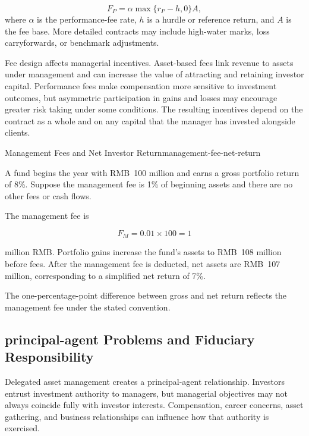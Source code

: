 \begin{equation}
F_P=\alpha\max\{r_P-h,0\}A,
\label{eq:ch14-performance-fee}
\end{equation}
where $\alpha$ is the performance-fee rate, $h$ is a hurdle or reference return, and $A$ is the fee base. More detailed contracts may include high-water marks, loss carryforwards, or benchmark adjustments.

Fee design affects managerial incentives. Asset-based fees link revenue to assets under management and can increase the value of attracting and retaining investor capital. Performance fees make compensation more sensitive to investment outcomes, but asymmetric participation in gains and losses may encourage greater risk taking under some conditions. The resulting incentives depend on the contract as a whole and on any capital that the manager has invested alongside clients.

\begin{example}{Management Fees and Net Investor Return}{management-fee-net-return}

A fund begins the year with RMB~100 million and earns a gross portfolio return of 8\%. Suppose the management fee is 1\% of beginning assets and there are no other fees or cash flows.

The management fee is

\[
F_M=0.01\times100=1
\]

million RMB. Portfolio gains increase the fund's assets to RMB~108 million before fees. After the management fee is deducted, net assets are RMB~107 million, corresponding to a simplified net return of 7\%.

The one-percentage-point difference between gross and net return reflects the management fee under the stated convention.

\end{example}

\subsection[principal-agent Problems and Fiduciary Responsibility]{principal-agent Problems and Fiduciary \\Responsibility}

Delegated asset management creates a principal-agent relationship. Investors entrust investment authority to managers, but managerial objectives may not always coincide fully with investor interests. Compensation, career concerns, asset gathering, and business relationships can influence how that authority is exercised.

